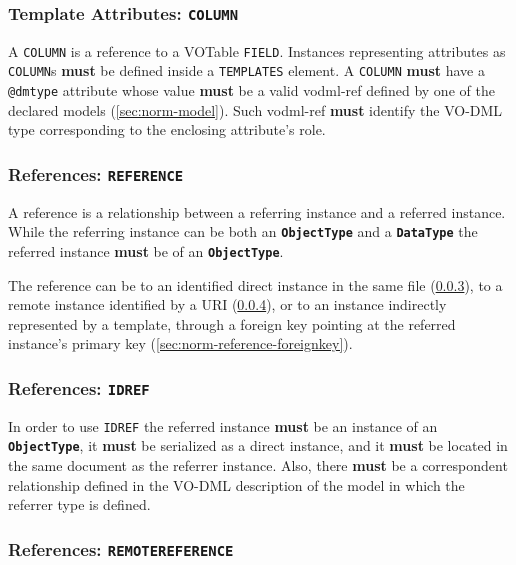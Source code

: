 \documentclass[11pt,a4paper]{ivoa}
\begin{document}
\subsubsection{Template Attributes:
\texttt{COLUMN}}\label{sec:norm-column}

A \texttt{COLUMN} is a reference to a VOTable \texttt{FIELD}. Instances
representing attributes as \texttt{COLUMN}s \textbf{must} be defined
inside a \texttt{TEMPLATES} element. A \texttt{COLUMN} \textbf{must}
have a \texttt{@dmtype} attribute whose value \textbf{must} be a valid
vodml-ref defined by one of the declared models (\ref{sec:norm-model}).
Such vodml-ref \textbf{must} identify the VO-DML type corresponding to
the enclosing attribute's role.

\subsubsection{References: \texttt{REFERENCE}}\label{sec:norm-reference}

A reference is a relationship between a referring instance and a
referred instance. While the referring instance can be both an
\textbf{\texttt{ObjectType}} and a \textbf{\texttt{DataType}} the
referred instance \textbf{must} be of an \textbf{\texttt{ObjectType}}.

The reference can be to an identified direct instance in the same file
(\ref{sec:norm-idref}), to a remote instance identified by a URI
(\ref{sec:norm-remote-reference}), or to an instance indirectly
represented by a template, through a foreign key pointing at the
referred instance's primary key (\ref{sec:norm-reference-foreignkey}).

\subsubsection{References: \texttt{IDREF}}\label{sec:norm-idref}

In order to use \texttt{IDREF} the referred instance \textbf{must} be an
instance of an \textbf{\texttt{ObjectType}}, it \textbf{must} be
serialized as a direct instance, and it \textbf{must} be located in the
same document as the referrer instance. Also, there \textbf{must} be a
correspondent relationship defined in the VO-DML description of the
model in which the referrer type is defined.

\subsubsection{References:
\texttt{REMOTEREFERENCE}}\label{sec:norm-remote-reference}
\end{document}
